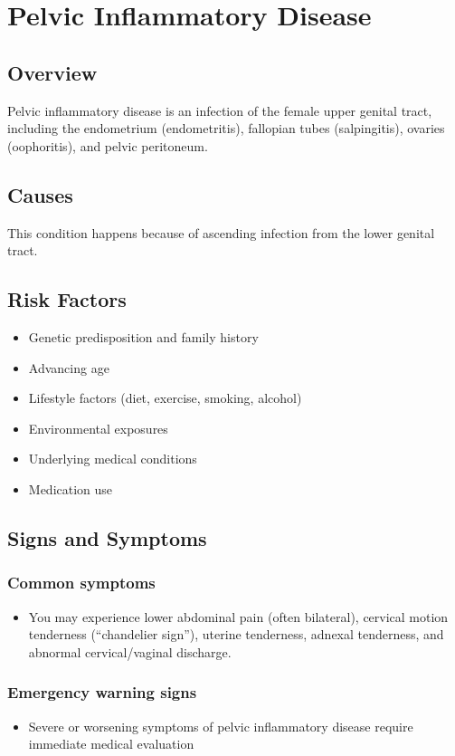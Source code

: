\chapter{Pelvic Inflammatory Disease}
\label{sec:Pelvic Inflammatory Disease}

\section{Overview}
Pelvic inflammatory disease is an infection of the female upper genital tract, including the endometrium (endometritis), fallopian tubes (salpingitis), ovaries (oophoritis), and pelvic peritoneum.
\section{Causes}
This condition happens because of ascending infection from the lower genital tract.     
\section{Risk Factors}

\begin{itemize}[noitemsep]
  \item Genetic predisposition and family history
  \item Advancing age
  \item Lifestyle factors (diet, exercise, smoking, alcohol)
  \item Environmental exposures
  \item Underlying medical conditions
  \item Medication use
\end{itemize}
\section{Signs and Symptoms}

\subsection{Common symptoms}
\begin{itemize}[noitemsep]
  \item You may experience lower abdominal pain (often bilateral), cervical motion tenderness (``chandelier sign''), uterine tenderness, adnexal tenderness, and abnormal cervical/vaginal discharge. 
  \end{itemize}

\subsection{Emergency warning signs}
\begin{itemize}[noitemsep]
  \item Severe or worsening symptoms of pelvic inflammatory disease require immediate medical evaluation
\end{itemize}
